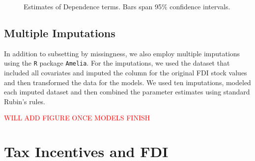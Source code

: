 \documentclass[reqno,onecolumn,letterpaper,12pt]{article}
\newcommand{\R}{\texttt{R}} %
\begin{document}
{\begin{figure}[!h]
\begin{tabular}{@{\hskip -.05cm}c@{\hskip .1cm}c@{\hskip .1cm}c}
\end{tabular}
\caption{\label{fig:q25netterms} Estimates of Dependence terms. Bars span 95\% confidence intervals. }
\end{figure}




\subsection{Multiple Imputations}

In addition to subsetting by missingness, we also employ multiple imputations using the \R{} package \texttt{Amelia}. For the imputations, we used the dataset that included all covariates and imputed the column for the original FDI stock values and then transformed the data for the models. We used ten imputations, modeled each imputed dataset and then combined the parameter estimates using standard Rubin's rules. \\

\centerline{\textcolor{red}{WILL ADD FIGURE ONCE MODELS FINISH}}



\section{Tax Incentives and FDI}\label{taxresults}

}
\end{document}
